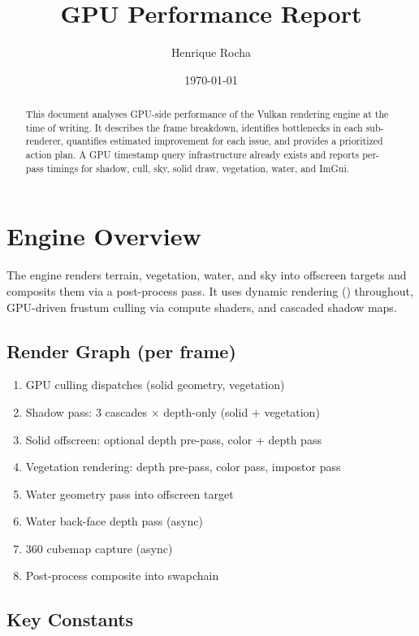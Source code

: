 \documentclass[11pt,a4paper]{article}
\title{GPU Performance Report}
\author{Henrique Rocha}
\date{\today}
\newcommand{\code}[1]{\texttt{\detokenize{#1}}}
\begin{document}
\maketitle

\begin{abstract}
This document analyses GPU-side performance of the Vulkan rendering engine at the time of writing. It describes the frame breakdown, identifies bottlenecks in each sub-renderer, quantifies estimated improvement for each issue, and provides a prioritized action plan. A GPU timestamp query infrastructure already exists and reports per-pass timings for shadow, cull, sky, solid draw, vegetation, water, and ImGui.
\end{abstract}

\tableofcontents

\section{Engine Overview}

The engine renders terrain, vegetation, water, and sky into offscreen targets and composits them via a post-process pass. It uses dynamic rendering (\code{VK\_KHR\_dynamic\_rendering}) throughout, GPU-driven frustum culling via compute shaders, and cascaded shadow maps.

\subsection{Render Graph (per frame)}

\begin{enumerate}
    \item GPU culling dispatches (solid geometry, vegetation)
    \item Shadow pass: 3 cascades $\times$ depth-only (solid + vegetation)
    \item Solid offscreen: optional depth pre-pass, color + depth pass
    \item Vegetation rendering: depth pre-pass, color pass, impostor pass
    \item Water geometry pass into offscreen target
    \item Water back-face depth pass (async)
    \item 360\textdegree{} cubemap capture (async)
    \item Post-process composite into swapchain
\end{enumerate}

\subsection{Key Constants}
\end{document}
